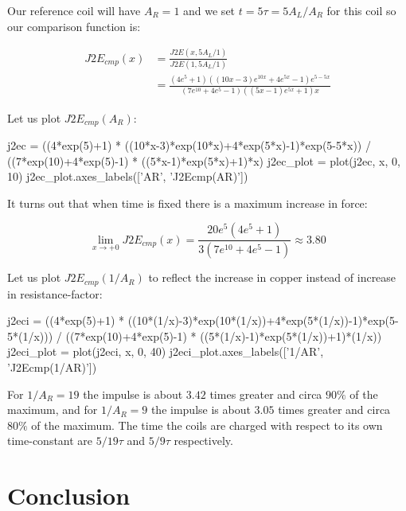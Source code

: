\documentclass[]{elementary-physics}
\begin{document}
Our reference coil will have $A_R = 1$ and we set $t = 5 \tau = 5 A_L/A_R$ for this coil so our comparison function is:

\begin{subequations}
\begin{align}
J2E_{cmp}(x) &= \frac{J2E(x,5 A_L/1)}{J2E(1,5 A_L/1)} \\
&= \frac{(4e^5+1)((10x-3)e^{10x}+4e^{5x}-1)e^{5-5x}}{(7e^{10}+4e^5-1)((5x-1)e^{5x}+1)x}
\end{align}
\end{subequations}

Let us plot $J2E_{cmp}(A_R)$:

\begin{sagesilent}
j2ec = ((4*exp(5)+1) * ((10*x-3)*exp(10*x)+4*exp(5*x)-1)*exp(5-5*x)) / ((7*exp(10)+4*exp(5)-1) * ((5*x-1)*exp(5*x)+1)*x)
j2ec_plot = plot(j2ec, x, 0, 10)
j2ec_plot.axes_labels(['AR', 'J2Ecmp(AR)'])
\end{sagesilent}


It turns out that when time is fixed there is a maximum increase in force:

\begin{equation}
\lim_{x \to +0} J2E_{cmp}(x) = \frac{20 e^5(4e^5+1)}{3(7e^{10}+4e^5-1)} \approx 3.80
\end{equation}

Let us plot $J2E_{cmp}(1/A_R)$ to reflect the increase in copper instead of increase in resistance-factor:

\begin{sagesilent}
j2eci = ((4*exp(5)+1) * ((10*(1/x)-3)*exp(10*(1/x))+4*exp(5*(1/x))-1)*exp(5-5*(1/x))) / ((7*exp(10)+4*exp(5)-1) * ((5*(1/x)-1)*exp(5*(1/x))+1)*(1/x))
j2eci_plot = plot(j2eci, x, 0, 40)
j2eci_plot.axes_labels(['1/AR', 'J2Ecmp(1/AR)'])
\end{sagesilent}


For $1/A_R = 19$ the impulse is about $3.42$ times greater and circa $90 \percent$ of the maximum, and for $1/A_R = 9$ the impulse is about $3.05$ times greater and circa $80 \percent$ of the maximum. The time the coils are charged with respect to its own time-constant are $5/19 \tau$ and $5/9 \tau$ respectively.

\section{Conclusion}
\end{document}
